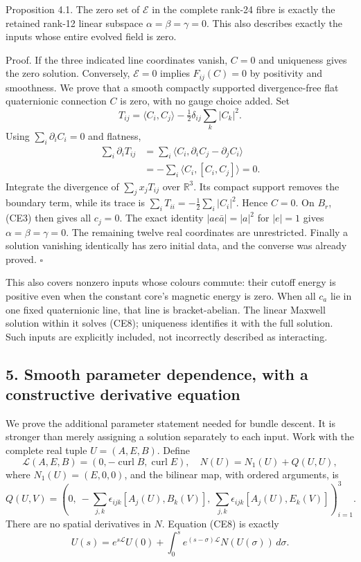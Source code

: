 \documentclass[11pt]{article}
\begin{document}
Proposition 4.1. The zero set of \(\mathscr E\) in the complete
rank-24 fibre is exactly the retained rank-12 linear subspace
\(\alpha=\beta=\gamma=0\). This also describes exactly the inputs
whose entire evolved field is zero.

Proof. If the three indicated line coordinates vanish, \(C=0\)
and uniqueness gives the zero solution. Conversely, \(\mathscr E=0\)
implies \(F_{ij}(C)=0\) by positivity and smoothness.
We prove that a smooth compactly supported divergence-free flat
quaternionic connection \(C\) is zero, with no gauge choice added.
Set
\[
 T_{ij}=\langle C_i,C_j\rangle-\tfrac12\delta_{ij}\sum_k|C_k|^2.
\]
Using \(\sum_i\partial_iC_i=0\) and flatness,
\[
 \begin{aligned}
 \sum_i\partial_iT_{ij}
 &=\sum_i\langle C_i,\partial_iC_j-\partial_jC_i\rangle\\
 &=-\sum_i\langle C_i,[C_i,C_j]\rangle=0.
 \end{aligned}
\]
Integrate the divergence of \(\sum_jx_jT_{ij}\) over \(\mathbb R^3\).
Its compact support removes the boundary term, while its trace is
\(\sum_iT_{ii}=-\tfrac12\sum_i|C_i|^2\). Hence \(C=0\).
On \(B_r\), (CE3) then gives all \(c_j=0\). The exact identity
\(|a e\bar a|=|a|^2\) for \(|e|=1\) gives
\(\alpha=\beta=\gamma=0\). The remaining twelve real coordinates are
unrestricted. Finally a solution vanishing identically has zero initial
data, and the converse was already proved. \(\square\)

This also covers nonzero inputs whose colours commute: their cutoff
energy is positive even when the constant core's magnetic energy is zero.
When all \(c_a\) lie in one fixed quaternionic line, that line is
bracket-abelian. The linear Maxwell solution within it solves (CE8);
uniqueness identifies it with the full solution. Such inputs are
explicitly included, not incorrectly described as interacting.

\subsection*{5. Smooth parameter dependence, with a constructive derivative equation}

We prove the additional parameter statement needed for bundle descent.
It is stronger than merely assigning a solution separately to each input.
Work with the complete real tuple \(U=(A,E,B)\). Define
\[
 \mathcal L(A,E,B)=(0,-\operatorname{curl}B,\operatorname{curl}E),
 \quad N(U)=N_1(U)+Q(U,U),
 \tag{CE24}
\]
where \(N_1(U)=(E,0,0)\), and the bilinear map, with ordered arguments,
is
\[
 Q(U,V)=\left(
 0,\ -\sum_{j,k}\epsilon_{ijk}[A_j(U),B_k(V)],\
       \sum_{j,k}\epsilon_{ijk}[A_j(U),E_k(V)]
 \right)_{i=1}^3.
 \tag{CE25}
\]
There are no spatial derivatives in \(N\). Equation (CE8) is exactly
\[
 U(s)=e^{s\mathcal L}U(0)
           +\int_0^s e^{(s-\sigma)\mathcal L}N(U(\sigma))\,d\sigma.
 \tag{CE26}
\]
\end{document}
